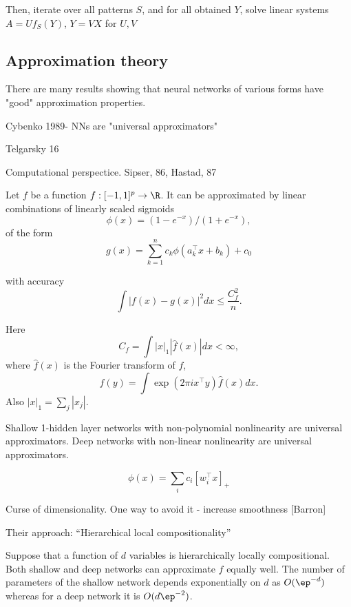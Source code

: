 \documentclass[english]{article}
\begin{document}
Then, iterate over all patterns $S$, and for all obtained $Y$, solve linear systems $A=Uf_S(Y)$, $Y=VX$ for $U,V$





\eenum 

\subsection{Approximation theory}

There are many results showing that neural networks of various forms have "good" approximation properties. 

\benum 
\item Cybenko 1989- NNs are "universal approximators"

Telgarsky 16

\item 
Computational perspectice. Sipser, 86, Hastad, 87



\item
\begin{theorem}[Barron, 1993]

Let $f$ be a function $f:[-1,1]^p \to \R$. It can be approximated by linear combinations of linearly scaled sigmoids $$\phi(x) = (1-e^{-x})/(1+e^{-x}),$$ of the form $$g(x) = \sum_{k=1}^n c_k \phi (a_k^\top x +b_k)+c_0$$ 

with accuracy $$\int |f(x)-g(x)|^2 dx \le \frac{C_f^2 }{n}.$$

Here $$C_f = \int |x|_1 |\hat f(x)|dx <\infty,$$ where $\hat f(x)$ is the Fourier transform of $f$, 
$$f(y) = \int\exp(2\pi i x^\top y) \hat f(x) dx.$$ Also $|x|_1 = \sum_j |x_j|$. 
\end{theorem}


\item 

\begin{theorem} Shallow 1-hidden layer networks with non-polynomial nonlinearity are universal approximators. Deep networks with non-linear nonlinearity are universal approximators. 

$$\phi(x) = \sum_i c_i [w_i^\top x]_+$$
\end{theorem}

Curse of dimensionality. One way to avoid it - increase smoothness [Barron]

Their approach: ``Hierarchical local compositionality''

\begin{theorem}

Suppose that a function of $d$ variables is hierarchically locally compositional. Both shallow and deep networks can approximate $f$ equally well. The number of parameters of the shallow network depends exponentially on $d$ as $O(\ep^{-d})$ whereas for a deep network it is $O(d\ep^{-2})$.
\end{theorem}
\end{document}
